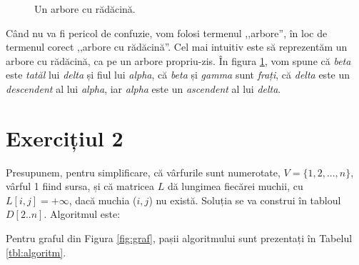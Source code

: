 \documentclass[9pt,a4paper]{article}
\begin{document}
{\begin{figure}[htbp]
\begin{minipage}[t!]{0.65\textwidth}
    \end{minipage}
    \caption{Un arbore cu rădăcină.}
    \label{fig:arbore}
\end{figure}

Când nu va fi pericol de confuzie, vom folosi termenul ,,arbore'', în loc de termenul corect ,,arbore cu rădăcină''. Cel mai intuitiv este să reprezentăm un arbore cu rădăcină, ca pe un arbore propriu-zis. În figura \ref{fig:arbore}, vom spune că \textit{beta} este \textit{tatăl} lui \textit{delta} și fiul lui
\textit{alpha}, că \textit{beta} și \textit{gamma} sunt \textit{frați}, că \textit{delta} este un \textit{descendent} al lui \textit{alpha}, iar \textit{alpha} este un \textit{ascendent} al lui \textit{delta}.}

\newpage
\section*{Exercițiul 2}

Presupunem, pentru simplificare, că vârfurile sunt numerotate, $V = \{1, 2, ..., n\}$, vârful 1 fiind sursa, și că matricea $L$ dă lungimea fiecărei muchii, cu $L[i,j] = +\infty$, dacă muchia ($i,j$) nu există. Soluția se va construi în tabloul $D[2 .. n]$. Algoritmul este:

\begin{algorithm}
    \begin{algorithmic}
         
         
         
        \EndFor
         
        \EndFor
        \EndRepeat
        \EndProcedure
    \end{algorithmic}
\end{algorithm}

Pentru graful din Figura \ref{fig:graf}, pașii algoritmului sunt prezentați în Tabelul \ref{tbl:algoritm}.
\end{document}
